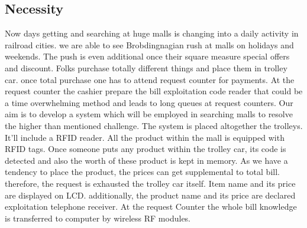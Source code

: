 \documentclass[12pt]{article}
\begin{document}
\subsection{Necessity}
\hspace*{1cm}Now days getting and searching at huge malls is changing into a daily activity in railroad cities. we are able to see Brobdingnagian rush at malls on holidays and weekends. The push is even additional once their square measure special offers and discount. Folks purchase totally different things and place them in trolley car. once total purchase one has to attend request counter for payments. At the request counter the cashier prepare the bill exploitation code reader that could be a time overwhelming method and leads to long queues at request counters. Our aim is to develop a system which will be employed in searching malls to resolve the higher than mentioned challenge. The system is placed altogether the trolleys. It'll include a RFID reader. All the product within the mall is equipped with RFID tags. Once someone puts any product within the trolley car, its code is detected and also the worth of these product is kept in memory. As we have a tendency to place the product, the prices can get supplemental to total bill. therefore, the request is exhausted the trolley car itself. Item name and its price are displayed on LCD. additionally, the product name and its price are declared exploitation telephone receiver. At the request Counter the whole bill knowledge is transferred to computer by wireless RF modules.\\
\end{document}
